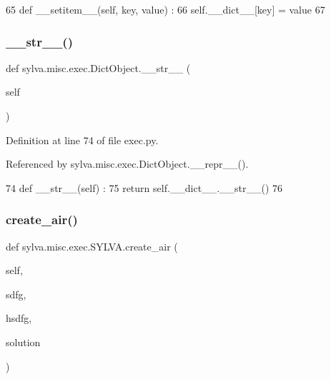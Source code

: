 \begin{DoxyCode}
65   \textcolor{keyword}{def }\_\_setitem\_\_(self, key, value) :
66     self.\_\_dict\_\_[key] = value
67 
\end{DoxyCode}
\mbox{\label{classsylva_1_1misc_1_1exec_1_1_dict_object_a7c974971714369cdba35b66479addd71}} 
\subsubsection{\texorpdfstring{\+\_\+\+\_\+str\+\_\+\+\_\+()}{\_\_str\_\_()}}
{\footnotesize\ttfamily def sylva.\+misc.\+exec.\+Dict\+Object.\+\_\+\+\_\+str\+\_\+\+\_\+ (\begin{DoxyParamCaption}\item[{}]{self }\end{DoxyParamCaption})\hspace{0.3cm}{\ttfamily [inherited]}}



Definition at line 74 of file exec.\+py.



Referenced by sylva.\+misc.\+exec.\+Dict\+Object.\+\_\+\+\_\+repr\+\_\+\+\_\+().


\begin{DoxyCode}
74   \textcolor{keyword}{def }\_\_str\_\_(self) :
75     \textcolor{keywordflow}{return} self.\_\_dict\_\_.\_\_str\_\_()
76 
\end{DoxyCode}
\mbox{\label{classsylva_1_1misc_1_1exec_1_1_s_y_l_v_a_a0fb6646b35fdfc07ca05bb2435e4d117}} 
\subsubsection{\texorpdfstring{create\+\_\+air()}{create\_air()}}
{\footnotesize\ttfamily def sylva.\+misc.\+exec.\+S\+Y\+L\+V\+A.\+create\+\_\+air (\begin{DoxyParamCaption}\item[{}]{self,  }\item[{}]{sdfg,  }\item[{}]{hsdfg,  }\item[{}]{solution }\end{DoxyParamCaption})}




